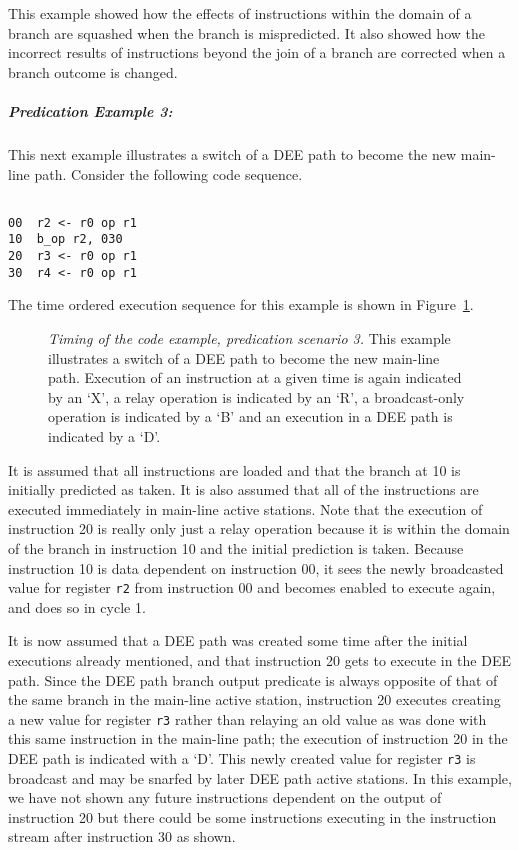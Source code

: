 \documentclass[10pt,dvips]{article}
\begin{document}
This example showed how the effects of instructions within the
domain of a branch are squashed when the branch is mispredicted.
It also showed how the incorrect results of instructions beyond the
join of a branch are corrected when a branch outcome is changed.

\newpage

\subparagraph{Predication Example 3: }
This next example illustrates a switch of a DEE path to become
the new main-line path.
Consider the following code sequence.

\begin{verbatim}

00	r2 <- r0 op r1
10	b_op r2, 030
20	r3 <- r0 op r1
30	r4 <- r0 op r1

\end{verbatim}

The time ordered execution sequence for this example is shown in
Figure~\ref{pex3}.

\begin{figure}
\centering
{}
\caption{{\em Timing of the code example, predication scenario 3.}
This example illustrates a switch of a DEE path to
become the new main-line path.
Execution of an instruction at a given time is
again indicated by an `X', a relay operation is indicated by an `R',
a broadcast-only operation is indicated by a `B' and an execution in
a DEE path is indicated by a `D'.}
\label{pex3}
\end{figure}

It is assumed that all instructions are loaded and that
the branch at 10 is initially predicted as taken.
It is also assumed that all of the instructions are
executed immediately in main-line active stations.
Note that the execution of instruction 20 is really only
just a relay operation because it is within the domain of the branch 
in instruction 10 and the initial prediction is taken.
Because instruction 10 is data dependent on instruction 00, it
sees the newly broadcasted value
for register
{\tt r2}
from instruction 00 and becomes enabled to execute again,
and does so
in cycle 1.

It is now assumed that a DEE path was created some time
after the initial executions already mentioned, and that
instruction 20 gets to execute in the DEE path.  Since
the DEE path branch output predicate is always opposite of
that of the same branch in the main-line active station,
instruction 20 executes creating a new value for
register
{\tt r3}
rather than relaying an old value as was done with this
same instruction in the main-line path; the execution of
instruction 20 in the DEE path is indicated with a `D'.
This newly created value for register
{\tt r3}
is broadcast and may be snarfed by later DEE path
active stations.
In this example, we have not shown any future instructions
dependent on the output of instruction 20 but there could be
some instructions executing in the instruction stream after instruction 30
as shown.
\end{document}
